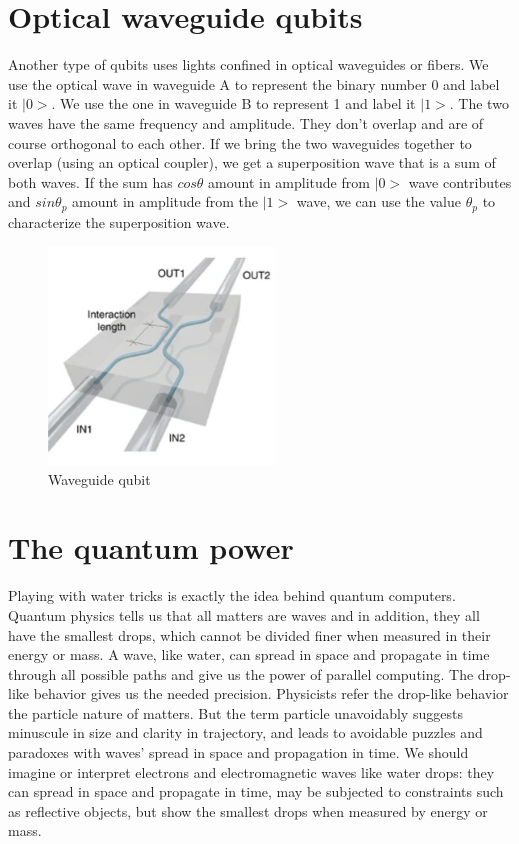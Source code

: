 \documentclass{book}
\begin{document}
\section{Optical waveguide qubits}
Another type of qubits uses lights confined in optical waveguides or fibers. We use the optical wave in waveguide A to represent the binary number 0 and label it $|0>$. We use the one in waveguide B to represent 1 and label it $|1>$. The two waves have the same frequency and amplitude. They don't overlap and are of course orthogonal to each other. If we bring the two waveguides together to overlap (using an optical coupler), we get a superposition wave that is a sum of both waves. If the sum has $cos\theta$ amount in amplitude from $|0>$ wave contributes and $sin\theta_p$ amount in amplitude from the $|1>$ wave, we can use the value $\theta_p$ to characterize the superposition wave.

\begin{figure}[ht]
\includegraphics[width=6cm]{pic/wguideQubit.png}
\caption{Waveguide qubit}
\label{Waveguide}
\end{figure}

\section{The quantum power}
Playing with water tricks is exactly the idea behind quantum computers. Quantum physics tells us that all matters are waves and in addition, they all have the smallest drops, which cannot be divided finer when measured in their energy or mass. A wave, like water, can spread in space and propagate in time through all possible paths and give us the power of parallel computing. The drop-like behavior gives us the needed precision. Physicists refer the drop-like behavior the particle nature of matters. But the term particle unavoidably suggests minuscule in size and clarity in trajectory, and leads to avoidable puzzles and paradoxes with waves' spread in space and propagation in time. We should imagine or interpret electrons and electromagnetic waves like water drops: they can spread in space and propagate in time, may be subjected to constraints such as reflective objects, but show the smallest drops when measured by energy or mass.
\end{document}
